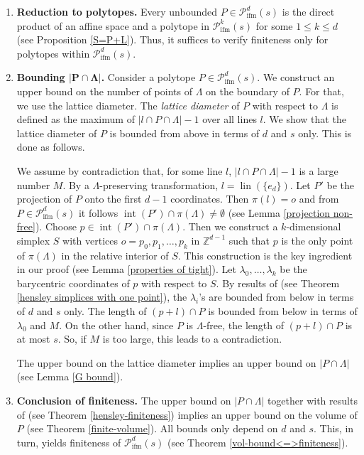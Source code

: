\documentclass[a4paper]{article}
\theoremstyle{plain}
\begin{document}
\begin{enumerate}
  \item {\bf Reduction to polytopes.}
    Every unbounded $P \in {{\mathcal{P}}_{{\mathop{\mathrm{{ifm}}}}}^{{d}}({s})}$ is the direct
    product of an affine space and a polytope in
    ${{\mathcal{P}}_{{\mathop{\mathrm{{ifm}}}}}^{{k}}({s})}$ for some $1 \le k \le d$ (see Proposition
    \ref{S=P+L}).
    Thus, it suffices to verify finiteness only for
    polytopes within ${{\mathcal{P}}_{{\mathop{\mathrm{{ifm}}}}}^{{d}}({s})}$.
  \item {\bf Bounding $\boldsymbol{|P \cap \Lambda|}$.}
    Consider a polytope $P \in {{\mathcal{P}}_{{\mathop{\mathrm{{ifm}}}}}^{{d}}({s})}$.
    We construct an upper bound on the number of points of
    $\Lambda$ on the boundary of $P$.
    For that, we use the lattice diameter.
    The \emph{lattice diameter} of $P$ with respect to
    $\Lambda$ is defined as the maximum of $|l \cap P \cap
    \Lambda|-1$ over all lines $l$. 
    We show that the lattice diameter of $P$ is bounded from
    above in terms of $d$ and $s$ only.
    This is done as follows.

    We assume by contradiction that, for some line $l$,  $|l
    \cap P \cap \Lambda|-1$ is a large number $M$.
    By a $\Lambda$-preserving transformation, $l =
    {{\mathop{\mathrm{{lin}}}}}(\{e_d\})$.
    Let $P'$ be the projection of $P$ onto the first $d-1$
    coordinates.
    Then $\pi(l) = o$ and from $P \in {{\mathcal{P}}_{{\mathop{\mathrm{{ifm}}}}}^{{d}}({s})}$ it
    follows ${{\mathop{\mathrm{{int}}}}}(P') \cap \pi(\Lambda) \ne \emptyset$ (see
    Lemma \ref{projection non-free}).
    Choose $p \in {{\mathop{\mathrm{{int}}}}}(P') \cap \pi(\Lambda)$.
    Then we construct a $k$-dimensional simplex $S$ with
    vertices $ o=p_0, p_1, \dots, p_k$ in ${\mathbb{Z}}^{d-1}$
    such that $p$ is the only point of $\pi(\Lambda)$ in the
    relative interior of $S$.
    This construction is the key ingredient in our proof
    (see Lemma \ref{properties of tight}).
    Let $\lambda_0, \dots, \lambda_k$ be the barycentric
    coordinates of $p$ with respect to $S$.
    By results of \cite{hensley-1983,lagarias-ziegler-1991}
    (see Theorem \ref{hensley simplices with one point}),
    the $\lambda_i$'s are bounded from below in terms of $d$
    and $s$ only.
    The length of $(p+l) \cap P$ is bounded from below in
    terms of $\lambda_0$ and $M$.
    On the other hand, since $P$ is $\Lambda$-free, the
    length of $(p+l) \cap P$ is at most $s$.
    So, if $M$ is too large, this leads to a contradiction.

    The upper bound on the lattice diameter implies an upper
    bound on $|P \cap \Lambda|$ (see Lemma \ref{G bound}).
  \item {\bf Conclusion of finiteness.}
    The upper bound on $|P \cap \Lambda|$ together with
    results of \cite{hensley-1983,lagarias-ziegler-1991}
    (see Theorem \ref{hensley-finiteness}) implies an upper
    bound on the volume of $P$ (see Theorem
    \ref{finite-volume}).
    All bounds only depend on $d$ and $s$.
    This, in turn, yields finiteness of ${{\mathcal{P}}_{{\mathop{\mathrm{{ifm}}}}}^{{d}}({s})}$ (see
    Theorem \ref{vol-bound<=>finiteness}).
\end{enumerate}
\end{document}
